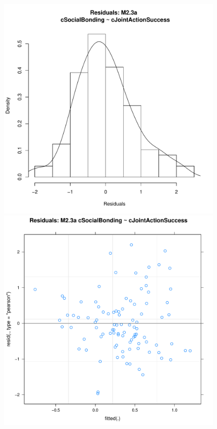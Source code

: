 \documentclass[12pt]{report}
\begin{document}
{\begin{figure}[htbp]
  \includegraphics[scale =.4]{../images/MLM23aHist.pdf}
  \includegraphics[scale =.4]{../images/MLM23aScatter.pdf}

\end{figure}}
\end{document}
